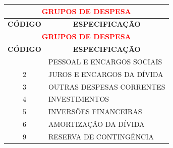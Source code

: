 \documentclass{article}
\begin{document}
\renewcommand*{\arraystretch}{1.5}
\footnotesize
\renewcommand*{\arraystretch}{2}
\noindent\begin{longtable}[c]{m{1cm}|m{11cm}}
\multicolumn{2}{c}{\cellcolor{gray!50} \textcolor{red} {\normalsize \textbf{GRUPOS DE DESPESA}}}\Tstrut  \\[2ex]
\hline\hline
\multicolumn{1}{c|}{\textbf{CÓDIGO}} & \multicolumn{1}{c}{\textbf{ESPECIFICAÇÃO}} \\
\hline
\endfirsthead
\multicolumn{2}{c}{\cellcolor{gray!50} \textcolor{red} {\normalsize \textbf{GRUPOS DE DESPESA}}}\Tstrut  \\[2ex]
\hline\hline
\multicolumn{1}{c|}{\textbf{CÓDIGO}} & \multicolumn{1}{c}{\textbf{ESPECIFICAÇÃO}} \\
\hline
\endhead
\endfoot
\hline\hline\hline
\endlastfoot
\multicolumn{1}{c|}{ 1 } & PESSOAL E ENCARGOS SOCIAIS \\
\multicolumn{1}{c|}{ 2 } & JUROS E ENCARGOS DA DÍVIDA \\
\multicolumn{1}{c|}{ 3 } & OUTRAS DESPESAS CORRENTES \\
\multicolumn{1}{c|}{ 4 } & INVESTIMENTOS \\
\multicolumn{1}{c|}{ 5 } & INVERSÕES FINANCEIRAS \\
\multicolumn{1}{c|}{ 6 } & AMORTIZAÇÃO DA DÍVIDA \\
\multicolumn{1}{c|}{ 9 } & RESERVA DE CONTINGÊNCIA \\
\end{longtable}
\end{document}
